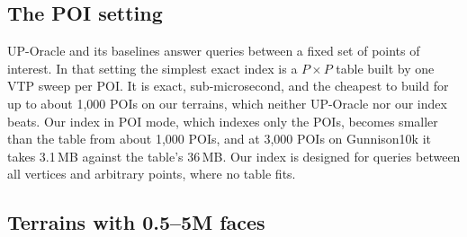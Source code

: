 \documentclass[sigconf,nonacm,screen]{acmart}
\begin{document}
\subsection{The POI setting}

UP-Oracle and its baselines answer queries between a fixed set of points of interest. In that setting the simplest
exact index is a $P\times P$ table built by one VTP sweep per POI. It is exact, sub-microsecond, and the cheapest
to build for up to about 1,000 POIs on our terrains, which neither UP-Oracle nor our index beats. Our index in POI
mode, which indexes only the POIs, becomes smaller than the table from about 1,000 POIs, and at 3,000 POIs on
Gunnison10k it takes 3.1\,MB against the table's 36\,MB. Our index is designed for queries between all vertices and
arbitrary points, where no table fits.

\subsection{Terrains with 0.5--5M faces}
\label{sec:server}
\end{document}
